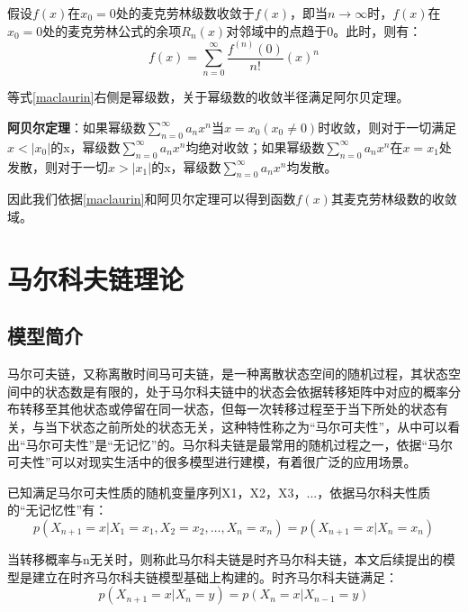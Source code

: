 假设$f(x)$在$x_0=0$处的麦克劳林级数收敛于$f(x)$，即当$n\rightarrow \infty $时，$f(x)$在$x_0=0$处的麦克劳林公式的余项$R_n(x)$对邻域中的点趋于0。此时，则有：
\begin{equation}
\label{maclaurin}
f\left( x \right) =\sum_{n=0}^{\infty}{\frac{f^{\left( n \right)}\left( 0 \right)}{n!}}\left( x \right) ^n
\end{equation}

等式\ref{maclaurin}右侧是幂级数，关于幂级数的收敛半径满足阿尔贝定理。

\textbf{阿贝尔定理}：如果幂级数$\sum_{n=0}^{\infty}{a_nx^n}$当$x=x_0(x_0 \ne 0)$时收敛，则对于一切满足$x<|x_0|$的x，幂级数$\sum_{n=0}^{\infty}{a_nx^n}$均绝对收敛；如果幂级数$\sum_{n=0}^{\infty}{a_nx^n}$在$x=x_1$处发散，则对于一切$x>|x_1|$的x，幂级数$\sum_{n=0}^{\infty}{a_nx^n}$均发散。

因此我们依据\ref{maclaurin}和阿贝尔定理可以得到函数$f(x)$其麦克劳林级数的收敛域。


\section{马尔科夫链理论}

\subsection{模型简介}

马尔可夫链，又称离散时间马可夫链，是一种离散状态空间的随机过程，其状态空间中的状态数是有限的，处于马尔科夫链中的状态会依据转移矩阵中对应的概率分布转移至其他状态或停留在同一状态，但每一次转移过程至于当下所处的状态有关，与当下状态之前所处的状态无关，这种特性称之为“马尔可夫性”，从中可以看出“马尔可夫性”是“无记忆”的。马尔科夫链是最常用的随机过程之一，依据“马尔可夫性”可以对现实生活中的很多模型进行建模，有着很广泛的应用场景。

已知满足马尔可夫性质的随机变量序列X1，X2，X3，...，依据马尔科夫性质的“无记忆性”有：
\begin{equation}
\label{markov_nature}
p\left(X_{n+1}=x | X_{1}=x_{1}, X_{2}=x_{2}, \ldots, X_{n}=x_{n}\right)=p\left(X_{n+1}=x | X_{n}=x_{n}\right)
\end{equation}

当转移概率与n无关时，则称此马尔科夫链是时齐马尔科夫链，本文后续提出的模型是建立在时齐马尔科夫链模型基础上构建的。时齐马尔科夫链满足：
\begin{equation}
\label{time_homogeneity}
p\left(X_{n+1}=x | X_{n}=y\right)=p\left(X_{n}=x | X_{n-1}=y\right)
\end{equation}


